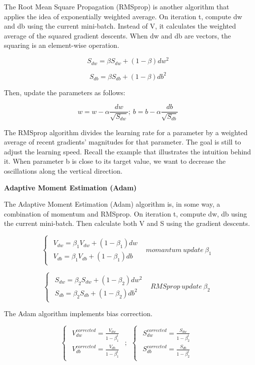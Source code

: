\documentclass[
  12pt,
]{krantz}
\begin{document}
The Root Mean Square Propagation (RMSprop) is another algorithm that applies the idea of exponentially weighted average. On iteration t, compute dw and db using the current mini-batch. Instead of V, it calculates the weighted average of the squared gradient descents. When dw and db are vectors, the squaring is an element-wise operation.

\[S_{dw}=\beta S_{dw} + (1-\beta)dw^2\]

\[S_{db}=\beta S_{db} + (1-\beta)db^2\]

Then, update the parameters as follows:

\[w = w - \alpha \frac{dw}{\sqrt{S_{dw}}};\ b=b-\alpha \frac{db}{\sqrt{S_{db}}}\]

The RMSprop algorithm divides the learning rate for a parameter by a weighted average of recent gradients' magnitudes for that parameter. The goal is still to adjust the learning speed. Recall the example that illustrates the intuition behind it. When parameter b is close to its target value, we want to decrease the oscillations along the vertical direction.

\textbf{Adaptive Moment Estimation (Adam)}

The Adaptive Moment Estimation (Adam) algorithm is, in some way, a combination of momentum and RMSprop. On iteration t, compute dw, db using the current mini-batch. Then calculate both V and S using the gradient descents.

\[\begin{cases} \begin{array}{c} V_{dw}=\beta_{1}V_{dw}+(1-\beta_{1})dw\\ V_{db}=\beta_{1}V_{db}+(1-\beta_{1})db \end{array} & momantum\ update\ \beta_{1}\end{cases}\]

\[\begin{cases} \begin{array}{c} S_{dw}=\beta_{2}S_{dw}+(1-\beta_{2})dw^{2}\\ S_{db}=\beta_{2}S_{db}+(1-\beta_{2})db^{2} \end{array} & RMSprop\ update\ \beta_{2}\end{cases}\]

The Adam algorithm implements bias correction.

\[\begin{cases} \begin{array}{c} V_{dw}^{corrected}=\frac{V_{dw}}{1-\beta_{1}^{t}}\\ V_{db}^{corrected}=\frac{V_{db}}{1-\beta_{1}^{t}} \end{array}\end{cases};\ \ \begin{cases} \begin{array}{c} S_{dw}^{corrected}=\frac{S_{dw}}{1-\beta_{2}^{t}}\\ S_{db}^{corrected}=\frac{S_{db}}{1-\beta_{2}^{t}} \end{array}\end{cases}\]
\end{document}

